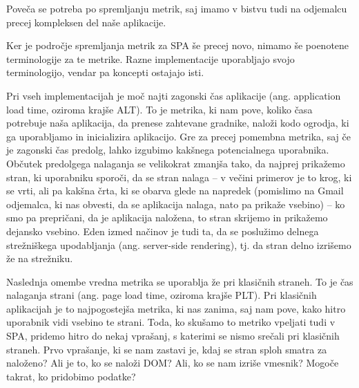 \documentclass[a4paper, 12pt]{book}
\begin{document}
Poveča se potreba po spremljanju metrik, saj imamo v bistvu tudi na odjemalcu precej kompleksen del naše aplikacije.

Ker je področje spremljanja metrik za SPA še precej novo, nimamo še poenotene terminologije za te metrike. Razne implementacije \cite{linkedin_rum}\cite{mezzurite_website} uporabljajo svojo terminologijo, vendar pa koncepti ostajajo isti.

Pri vseh implementacijah je moč najti zagonski čas aplikacije (ang. application load time, oziroma krajše ALT). To je metrika, ki nam pove, koliko časa potrebuje naša aplikacija, da prenese zahtevane gradnike, naloži kodo ogrodja, ki ga uporabljamo in inicializira aplikacijo. Gre za precej pomembna metrika, saj če je zagonski čas predolg, lahko izgubimo kakšnega potencialnega uporabnika. Občutek predolgega nalaganja se velikokrat zmanjša tako, da najprej prikažemo stran, ki uporabniku sporoči, da se stran nalaga – v večini primerov je to krog, ki se vrti, ali pa kakšna črta, ki se obarva glede na napredek (pomislimo na Gmail odjemalca, ki nas obvesti, da se aplikacija nalaga, nato pa prikaže vsebino) – ko smo pa prepričani, da je aplikacija naložena, to stran skrijemo in prikažemo dejansko vsebino. Eden izmed načinov je tudi ta, da se poslužimo delnega strežniškega upodabljanja (ang. server-side rendering), tj. da stran delno izrišemo že na strežniku.

Naslednja omembe vredna metrika se uporablja že pri klasičnih straneh. To je čas nalaganja strani (ang. page load time, oziroma krajše PLT). Pri klasičnih aplikacijah je to najpogostejša metrika, ki nas zanima, saj nam pove, kako hitro uporabnik vidi vsebino te strani. Toda, ko skušamo to metriko vpeljati tudi v SPA, pridemo hitro do nekaj vprašanj, s katerimi se nismo srečali pri klasičnih straneh. Prvo vprašanje, ki se nam zastavi je, kdaj se stran sploh smatra za naloženo? Ali je to, ko se naloži DOM? Ali, ko se nam izriše vmesnik? Mogoče takrat, ko pridobimo podatke?
\end{document}
